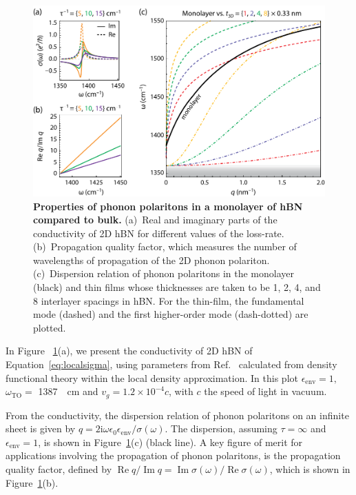 \documentclass[aps,prb,twocolumn,
	           groupedaddress,superscriptaddress,
               amsfonts,amssymb,amsmath,floatfix,
	           citeautoscript]{revtex4-1}
\renewcommand{\Im}{\operatorname{Im}}
\renewcommand{\Re}{\operatorname{Re}}
\newcommand{\iu}{\mathrm{i}}
\begin{document}
\begin{figure}[t]
    \includegraphics[width=.7\linewidth]{figure2hBN.pdf}
    \caption{%
        \textbf{Properties of phonon polaritons in a monolayer of hBN compared to bulk.} (a)~Real and imaginary parts of the conductivity of 2D hBN for different values of the loss-rate. (b)~Propagation quality factor, which measures the number of wavelengths of propagation of the 2D phonon polariton. (c)~Dispersion relation of phonon polaritons in the monolayer (black) and thin films whose thicknesses are taken to be 1, 2, 4, and 8 interlayer spacings in hBN. For the thin-film, the fundamental mode (dashed) and the first higher-order mode (dash-dotted) are plotted. 
        \label{fig:2}
        }
\end{figure}



In Figure ~\ref{fig:2}(a), we present the conductivity of 2D hBN of Equation~\ref{eq:localsigma}, using parameters from Ref.~ calculated from density functional theory within the local density approximation. In this plot $\epsilon_{\mathrm{env}}=1,$ $\omega_{\mathrm{TO}} = $ \SI{1387}{\per\cm} and $v_g = 1.2\times 10^{-4}c$, with $c$ the speed of light in vacuum.

From the conductivity, the dispersion relation of phonon polaritons on an infinite sheet is given by $q={2\iu\omega\epsilon_0\epsilon_{\mathrm{env}}}/{\sigma(\omega)}$. The dispersion, assuming $\tau = \infty$ and $\epsilon_{\mathrm{env}}=1$, is shown in Figure~\ref{fig:2}(c) (black line). A key figure of merit for applications involving the propagation of phonon polaritons, is the propagation quality factor, defined by ${\Re q}/{\Im q} = {\Im\sigma(\omega)}/{\Re\sigma(\omega)}$, which is shown in Figure~\ref{fig:2}(b).
\end{document}
